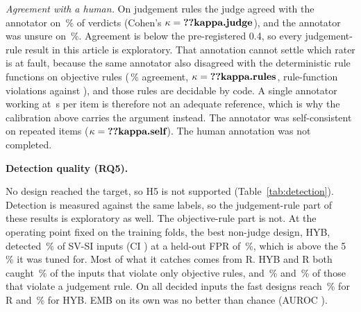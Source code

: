 \documentclass[journal]{IEEEtran}
\begin{document}
\emph{Agreement with a human.}\ifhumanlabels{} On judgement rules the judge agreed with the annotator
on \,\% of  verdicts (Cohen's $\kappa=\R{kappa.judge}$), and the annotator
was unsure on \,\%. \ifjudgeweak Agreement is below the pre-registered 0.4, so every
judgement-rule result in this article is exploratory.\fi{} That annotation cannot settle which rater is
at fault, because the same annotator also disagreed with the deterministic rule functions on objective
rules (\,\% agreement, $\kappa=\R{kappa.rules}$,  rule-function
violations against ), and those rules are decidable by code. A single annotator
working at \,s per item is therefore not an adequate reference, which is why the
calibration above carries the argument instead. The annotator was self-consistent on repeated items
($\kappa=\R{kappa.self}$).\else{} The human annotation was not completed.\fi


\textbf{Detection quality (RQ5).} 

No design reached the target, so H5 is not supported (Table~\ref{tab:detection}).\ifjudgeweak{}
Detection is measured against the same labels, so the judgement-rule part of these results is
exploratory as well. The objective-rule part is not.\fi{} At the operating point fixed on the training
folds, the best non-judge design, HYB, detected \,\% of SV-SI inputs (CI
) at a held-out FPR of \,\%, which is above the 5\,\% it was tuned for. Most
of what it catches comes from R. HYB and R both caught \,\% of the inputs that violate
only objective rules, and \,\% and \,\% of those that violate a judgement
rule. On all decided inputs the fast designs reach \,\% for R and
\,\% for HYB. EMB on its own was no better than chance (AUROC
).
\end{document}
